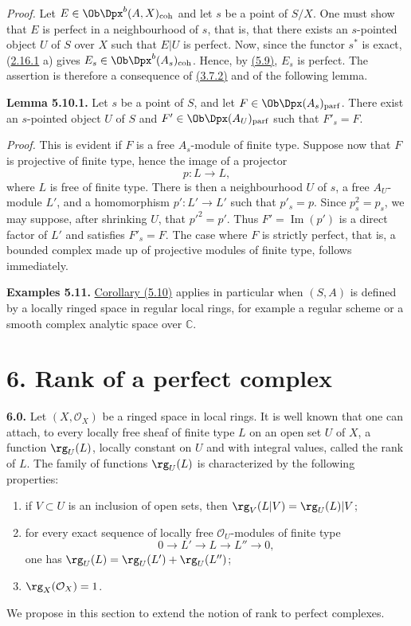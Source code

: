 \emph{Proof.} Let \(E\in\Ob\Dpx^b(A,X)_{\mathrm{coh}}\) and let \(s\) be a point of \(S/X\). One must show that \(E\) is perfect in a neighbourhood of \(s\), that is, that there exists an \(s\)-pointed object \(U\) of \(S\) over \(X\) such that \(E|U\) is perfect. Now, since the functor \(s^*\) is exact, (\hyperlink{sga6.e01.cor.2-16-1}{2.16.1} a) gives \(E_s\in\Ob\Dpx^b(A_s)_{\mathrm{coh}}\). Hence, by \hyperlink{sga6.e01.cor.5-9}{(5.9)}, \(E_s\) is perfect. The assertion is therefore a consequence of \hyperlink{sga6.e01.cor.3-7-2}{(3.7.2)} and of the following lemma.

\textbf{Lemma 5.10.1.} Let \(s\) be a point of \(S\), and let \(F\in\Ob\Dpx(A_s)_{\mathrm{parf}}\). There exist an \(s\)-pointed object \(U\) of \(S\) and \(F'\in\Ob\Dpx(A_U)_{\mathrm{parf}}\) such that \(F'_s=F\).

\emph{Proof.} This is evident if \(F\) is a free \(A_s\)-module of finite type. Suppose now that \(F\) is projective of finite type, hence the image of a projector
\[
  p:L\longrightarrow L,
\]
where \(L\) is free of finite type. There is then a neighbourhood \(U\) of \(s\), a free \(A_U\)-module \(L'\), and a homomorphism \(p':L'\to L'\) such that \(p'_s=p\). Since \(p_s^2=p_s\), we may suppose, after shrinking \(U\), that \(p'^2=p'\). Thus \(F'=\operatorname{Im}(p')\) is a direct factor of \(L'\) and satisfies \(F'_s=F\). The case where \(F\) is strictly perfect, that is, a bounded complex made up of projective modules of finite type, follows immediately.

\textbf{Examples 5.11.} \hyperlink{sga6.e01.cor.5-10}{Corollary (5.10)} applies in particular when \((S,A)\) is defined by a locally ringed space in regular local rings, for example a regular scheme or a smooth complex analytic space over \(\mathbb C\).

\section*{6. Rank of a perfect complex}

\textbf{6.0.} Let \((X,\mathcal O_X)\) be a ringed space in local rings. It is well known that one can attach, to every locally free sheaf of finite type \(L\) on an open set \(U\) of \(X\), a function \(\rg_U(L)\), locally constant on \(U\) and with integral values, called the rank of \(L\). The family of functions \(\rg_U(L)\) is characterized by the following properties:
\begin{enumerate}[label=(\roman*)]
\item if \(V\subset U\) is an inclusion of open sets, then \(\rg_V(L|V)=\rg_U(L)|V\);
\item for every exact sequence of locally free \(\mathcal O_U\)-modules of finite type
\[
  0\longrightarrow L'\longrightarrow L\longrightarrow L''\longrightarrow 0,
\]
one has \(\rg_U(L)=\rg_U(L')+\rg_U(L'')\);
\item \(\rg_X(\mathcal O_X)=1\).
\end{enumerate}
We propose in this section to extend the notion of rank to perfect complexes.

